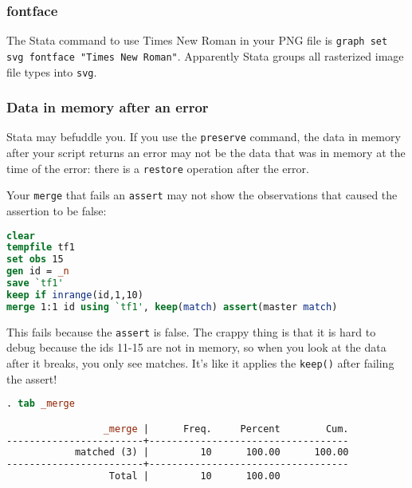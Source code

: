 \subsubsection{fontface}
The Stata command to use Times New Roman in your PNG file is \texttt{graph set svg fontface "Times New Roman"}.
Apparently Stata groups all rasterized image file types into \texttt{svg}.

\subsubsection{Data in memory after an error}

Stata may befuddle you.
If you use the \texttt{preserve} command,
the data in memory after your script returns an error may not be the data that was in memory at the time of the error:
there is a \texttt{restore} operation after the error.

Your \texttt{merge} that fails an \texttt{assert} may not show the observations that caused the assertion to be false:
\begin{lstlisting}[language=stata]
clear 
tempfile tf1
set obs 15
gen id = _n
save `tf1'
keep if inrange(id,1,10)
merge 1:1 id using `tf1', keep(match) assert(master match)
\end{lstlisting}

This fails because the \texttt{assert} is false.
The crappy thing is that it is hard to debug because the ids 11-15 are not in memory, so when you look at the data after it breaks, you only see matches.
It's like it applies the \texttt{keep()} after failing the assert!

\begin{lstlisting}[language=stata]
. tab _merge

                 _merge |      Freq.     Percent        Cum.
------------------------+-----------------------------------
            matched (3) |         10      100.00      100.00
------------------------+-----------------------------------
                  Total |         10      100.00
\end{lstlisting}
